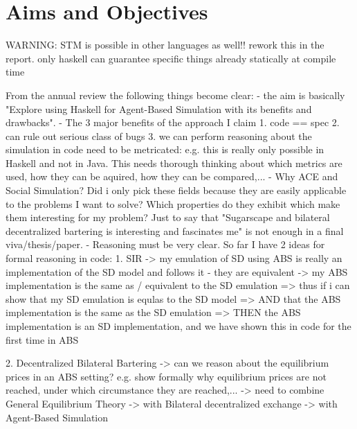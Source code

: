 \chapter{Aims and Objectives}
\label{chap:aimsObj}

WARNING:
STM is possible in other languages as well!! rework this in the report. only haskell can guarantee specific things already statically at compile time





From the annual review the following things become clear:
- the aim is basically "Explore using Haskell for Agent-Based Simulation with its benefits and drawbacks".
- The 3 major benefits of the approach I claim
	1. code == spec
	2. can rule out serious class of bugs
	3. we can perform reasoning about the simulation in code
	need to be metricated: e.g. this is really only possible in Haskell and not in Java. This needs thorough thinking about which metrics are used, how they can be aquired, how they can be compared,...
- Why ACE and Social Simulation? Did i only pick these fields because they are easily applicable to the problems I want to solve? Which properties do they exhibit which make them interesting for my problem? Just to say that "Sugarscape and bilateral decentralized bartering is interesting and fascinates me" is not enough in a final viva/thesis/paper.
- Reasoning must be very clear. So far I have 2 ideas for formal reasoning in code:
	1. SIR
		-> my emulation of SD using ABS is really an implementation of the SD model and follows it - they are equivalent
		-> my ABS implementation is the same as / equivalent to the SD emulation
			=> thus if i can show that my SD emulation is equlas to the SD model
			=> AND that the ABS implementation is the same as the SD emulation
			=> THEN the ABS implementation is an SD implementation, and we have shown this in code for the first time in ABS

	2. Decentralized Bilateral Bartering
		-> can we reason about the equilibrium prices in an ABS setting? e.g. show formally why equilibrium prices are not reached, under which circumstance they are reached,...
			-> need to combine General Equilibrium Theory
			-> with Bilateral decentralized exchange
			-> with Agent-Based Simulation 
			
